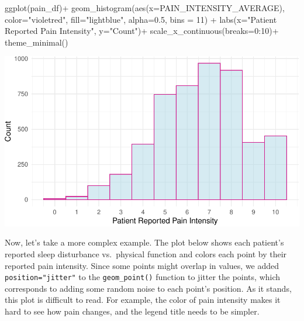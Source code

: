 \documentclass[
  letterpaper,
]{krantz}
\makeatletter
\newenvironment{Shaded}{\begin{snugshade}}{\end{snugshade}}
\newcommand{\AttributeTok}[1]{\textcolor[rgb]{0.40,0.45,0.13}{#1}}
\newcommand{\DecValTok}[1]{\textcolor[rgb]{0.68,0.00,0.00}{#1}}
\newcommand{\FloatTok}[1]{\textcolor[rgb]{0.68,0.00,0.00}{#1}}
\newcommand{\FunctionTok}[1]{\textcolor[rgb]{0.28,0.35,0.67}{#1}}
\newcommand{\NormalTok}[1]{\textcolor[rgb]{0.00,0.23,0.31}{#1}}
\newcommand{\SpecialCharTok}[1]{\textcolor[rgb]{0.37,0.37,0.37}{#1}}
\newcommand{\StringTok}[1]{\textcolor[rgb]{0.13,0.47,0.30}{#1}}
\newenvironment{kframe}{%
\medskip{}
\setlength{\fboxsep}{.8em}
 \def\at@end@of@kframe{}%
 \ifinner\ifhmode%
  \def\at@end@of@kframe{\end{minipage}}%
  \begin{minipage}{\columnwidth}%
 \fi\fi%
 \def\FrameCommand##1{\hskip\@totalleftmargin \hskip-\fboxsep
 \colorbox{shadecolor}{##1}\hskip-\fboxsep
     \hskip-\linewidth \hskip-\@totalleftmargin \hskip\columnwidth}%
 \MakeFramed {\advance\hsize-\width
   \@totalleftmargin\z@ \linewidth\hsize
   \@setminipage}}%
 {\par\unskip\endMakeFramed%
 \at@end@of@kframe}
\renewenvironment{Shaded}{\begin{kframe}}{\end{kframe}}
\makeatother
\begin{document}
\begin{Shaded}
\begin{Highlighting}[]
\FunctionTok{ggplot}\NormalTok{(pain\_df)}\SpecialCharTok{+}
  \FunctionTok{geom\_histogram}\NormalTok{(}\FunctionTok{aes}\NormalTok{(}\AttributeTok{x=}\NormalTok{PAIN\_INTENSITY\_AVERAGE), }\AttributeTok{color=}\StringTok{"violetred"}\NormalTok{, }
                 \AttributeTok{fill=}\StringTok{"lightblue"}\NormalTok{, }\AttributeTok{alpha=}\FloatTok{0.5}\NormalTok{, }\AttributeTok{bins =} \DecValTok{11}\NormalTok{) }\SpecialCharTok{+}
  \FunctionTok{labs}\NormalTok{(}\AttributeTok{x=}\StringTok{"Patient Reported Pain Intensity"}\NormalTok{, }\AttributeTok{y=}\StringTok{"Count"}\NormalTok{)}\SpecialCharTok{+}
  \FunctionTok{scale\_x\_continuous}\NormalTok{(}\AttributeTok{breaks=}\DecValTok{0}\SpecialCharTok{:}\DecValTok{10}\NormalTok{)}\SpecialCharTok{+}
  \FunctionTok{theme\_minimal}\NormalTok{()}
\end{Highlighting}
\end{Shaded}

\begin{center}
\includegraphics[width=1\textwidth,height=\textheight]{book/visualization_ggplot_files/figure-pdf/unnamed-chunk-8-1.pdf}
\end{center}

Now, let's take a more complex example. The plot below shows each
patient's reported sleep disturbance vs.~physical function and colors
each point by their reported pain intensity. Since some points might
overlap in values, we added \texttt{position="jitter"} to the
\texttt{geom\_point()} function to jitter the points, which corresponds
to adding some random noise to each point's position. As it stands, this
plot is difficult to read. For example, the color of pain intensity
makes it hard to see how pain changes, and the legend title needs to be
simpler.
\end{document}
